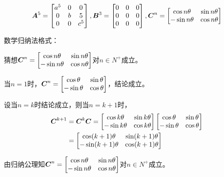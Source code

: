 \documentclass{ctexart}
\begin{document}
\begin{problem}\

\begin{equation*}
    \boldsymbol{A}^5=\begin{bmatrix}a^5&0&0\\0&b&5\\0&0&c^5\end{bmatrix},\boldsymbol{B}^3=\begin{bmatrix}0&0&0\\0&0&0\\0&0&0\end{bmatrix},\boldsymbol{C}^n=\begin{bmatrix}\cos n\theta&\sin n\theta\\-\sin n\theta&\cos n\theta\end{bmatrix}
\end{equation*}

数学归纳法格式：

猜想\(\boldsymbol{C}^n=\begin{bmatrix}\cos n\theta&\sin n\theta\\-\sin n\theta&\cos n\theta\end{bmatrix}\)对\(n\in N^+\)成立。

当\(n=1\)时，\(\boldsymbol{C}^n=\begin{bmatrix}\cos \theta&\sin \theta\\-\sin \theta&\cos \theta\end{bmatrix}\)，结论成立。

设当\(n=k\)时结论成立，则当\(n=k+1\)时，
\begin{align*}
    \boldsymbol{C}^{k+1} & =\boldsymbol{C}^k\boldsymbol{C}=\begin{bmatrix}\cos k\theta&\sin k\theta\\-\sin k\theta&\cos k\theta\end{bmatrix}\begin{bmatrix}\cos \theta&\sin \theta\\-\sin \theta&\cos \theta\end{bmatrix} \\
                & =\begin{bmatrix}\cos (k+1)\theta&\sin (k+1)\theta\\-\sin (k+1)\theta&\cos (k+1)\theta\end{bmatrix}
\end{align*}

由归纳公理知\(\boldsymbol{C}^n=\begin{bmatrix}\cos n\theta&\sin n\theta\\-\sin n\theta&\cos n\theta\end{bmatrix}\)对\(n\in N^+\)成立。

\end{problem}
\end{document}
